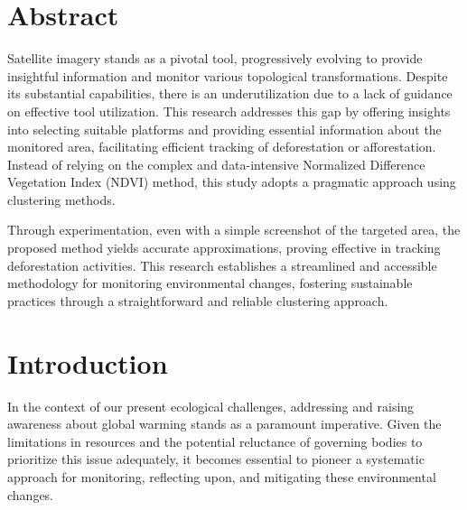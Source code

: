 \documentclass[12pt,a4paper,IEEEtran]{article}
\begin{document}
\setlength{\oddsidemargin}{0.25in}
\setlength{\textwidth}{6.5in}
\setlength{\topmargin}{0in}
\setlength{\textheight}{8.5in}








\newpage
\section{Abstract}
Satellite imagery stands as a pivotal tool, progressively evolving to provide insightful information and monitor various topological transformations. Despite its substantial capabilities, there is an underutilization due to a lack of guidance on effective tool utilization. This research addresses this gap by offering insights into selecting suitable platforms and providing essential information about the monitored area, facilitating efficient tracking of deforestation or afforestation. Instead of relying on the complex and data-intensive Normalized Difference Vegetation Index (NDVI) method, this study adopts a pragmatic approach using clustering methods.

Through experimentation, even with a simple screenshot of the targeted area, the proposed method yields accurate approximations, proving effective in tracking deforestation activities. This research establishes a streamlined and accessible methodology for monitoring environmental changes, fostering sustainable practices through a straightforward and reliable clustering approach.

\section{Introduction}
In the context of our present ecological challenges, addressing and raising awareness about global warming stands as a paramount imperative. Given the limitations in resources and the potential reluctance of governing bodies to prioritize this issue adequately, it becomes essential to pioneer a systematic approach for monitoring, reflecting upon, and mitigating these environmental changes. 
\end{document}
